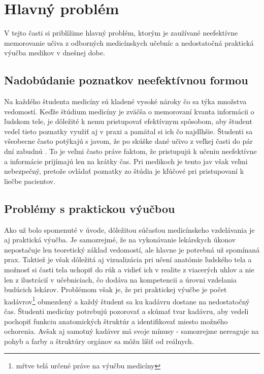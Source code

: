 \documentclass[10pt,twoside,slovak,a4paper]{article}
\begin{document}
\section{Hlavný problém} \label{prvacast}
V tejto časti si priblížime hlavný problém, ktorým je zaužívané neefektívne memorovanie učiva z odborných medicínskych učebníc a nedostatočná praktická výučba medikov v dnešnej dobe. 

\subsection{Nadobúdanie poznatkov neefektívnou formou} \label{prvacast:sub1} 
Na každého študenta medicíny sú kladené vysoké nároky čo sa týka množstva vedomostí. Keďže štúdium medicíny je zväčša o memorovaní kvanta informácii o ľudskom tele, je dôležité k nemu pristupovať efektívnym spôsobom, aby študent vedel tieto poznatky využiť aj v praxi a pamätal si ich čo najdlhšie. Študenti sa všeobecne často potýkajú s javom, že po skúške dané učivo z veľkej časti do pár dní zabudnú \cite{JimmyLIforget}. To je veľmi často práve faktom, že pristupujú k učeniu neefektívne a informácie prijímajú len na krátky čas. Pri medikoch je tento jav však veľmi nebezpečný, pretože ovládať poznatky zo štúdia je kľúčové pri pristupovaní k liečbe pacientov.

\subsection{Problémy s praktickou výučbou} \label{prvacast:sub2} 
Ako už bolo spomenuté v úvode, dôležitou súčasťou medicínskeho vzdelávania je aj praktická výučba. Je samozrejmé, že na vykonávanie lekárskych úkonov nepostačuje len teoretický základ vedomostí, ale hlavne je potrebná už spomínaná prax. Taktiež je však dôležitá aj vizualizácia pri učení anatómie ľudského tela a možnosť si časti tela uchopiť do rúk a vidieť ich v realite z viacerých uhlov a nie len z ilustrácií v učebniciach, čo dodáva na kompetencii a úrovni vzdelania budúcich lekárov. Problémom však je, že pri praktickej výučbe je počet kadávrov\footnote{mŕtve telá určené práve na výučbu medicíny} obmezdený a každý študent sa ku kadávru dostane na nedostatočný čas. Študenti medicíny potrebujú pozorovať a skúmať tvar kadávru, aby vedeli pochopiť funkciu anatomických štruktúr a identifikovať miesto možného ochorenia. Avšak aj samotný kadáver má svoje mínusy - samozrejme nereaguje na pohyb a farby a štruktúry orgánov sa môžu líšiť od reálnych.\cite{9611852}
\end{document}
